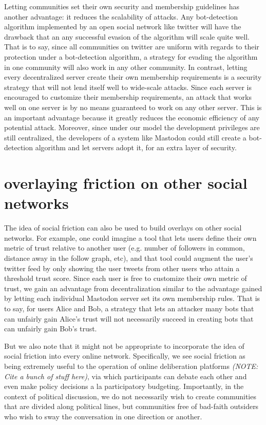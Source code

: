 \documentclass[sigconf,authordraft]{acmart}
\begin{document}
Letting communities set their own security and membership guidelines has another advantage: it reduces the scalability of attacks. Any bot-detection algorithm implemented by an open social network like twitter will have the drawback that an any successful evasion of the algorithm will scale quite well. That is to say, since all communities on twitter are uniform with regards to their protection under a bot-detection algorithm, a strategy for evading the algorithm in one community will also work in any other community. In contrast, letting every decentralized server create their own membership requirements is a security strategy that will not lend itself well to wide-scale attacks. Since each server is encouraged to customize their membership requirements, an attack that works well on one server is by no means guaranteed to work on any other server. This is an important advantage because it greatly reduces the economic efficiency of any potential attack. Moreover, since under our model the development privileges are still centralized, the developers of a system like Mastodon could still create a bot-detection algorithm and let servers adopt it, for an extra layer of security.

\section{overlaying friction on other social networks}

The idea of social friction can also be used to build overlays on other social networks. For example, one could imagine a tool that lets users define their own metric of trust relative to another user (e.g. number of followers in common, distance away in the follow graph, etc), and that tool could augment the user's twitter feed by only showing the user tweets from other users who attain a threshold trust score. Since each user is free to customize their own metric of trust, we gain an advantage from decentralization similar to the advantage gained by letting each individual Mastodon server set its own membership rules. That is to say, for users Alice and Bob, a strategy that lets an attacker many bots that can unfairly gain Alice's trust will not necessarily succeed in creating bots that can unfairly gain Bob's trust.

But we also note that it might not be appropriate to incorporate the idea of social friction into every online network. Specifically, we see social friction as being extremely useful to the operation of online deliberation platforms \textit{(NOTE: Cite a bunch of stuff here)}, via which participants can debate each other and even make policy decisions a la participatory budgeting. Importantly, in the context of political discussion, we do not necessarily wish to create communities that are divided along political lines, but communities free of bad-faith outsiders who wish to sway the conversation in one direction or another. 
\end{document}
